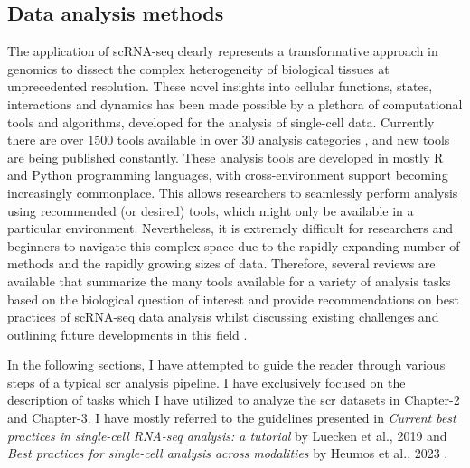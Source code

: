 \subsection{Data analysis methods}
\label{sec:scrna_analysis}
The application of scRNA-seq clearly represents a transformative approach in genomics to dissect the complex heterogeneity of biological tissues at unprecedented resolution. These novel insights into cellular functions, states, interactions and dynamics has been made possible by  a plethora of computational tools and algorithms, developed for the analysis of single-cell data. Currently there are over 1500 tools available in over 30 analysis categories \textbf{\cite{noauthor_scrna-tools_nodate}}, and new tools are being published constantly. These analysis tools are developed in mostly R and Python programming languages, with cross-environment support becoming increasingly commonplace. This allows researchers to seamlessly perform analysis using recommended (or desired) tools, which might only be available in a particular environment. Nevertheless, it is extremely difficult for researchers and beginners to navigate this complex space due to the rapidly expanding number of methods and the rapidly growing sizes of data. Therefore, several reviews are available that summarize the many tools available for a variety of analysis tasks based on the biological question of interest and provide recommendations on best practices of scRNA-seq data analysis whilst discussing existing challenges and outlining future developments in this field \textbf{\cite{zappia_exploring_2018,wu_tools_2020,balzer_how_2021,su_data_2022,ke_single_2022,lueckenmalte_d_current_2019,heumos_best_2023}}.

\vspace{0.2cm}

\begin{Abstract}
\vspace{3mm}
In the following sections, I have attempted to guide the reader through various steps of a typical \gls{scr} analysis pipeline. I have exclusively focused on the description of tasks which I have utilized to analyze the \gls{scr} datasets in Chapter-2 and Chapter-3. I have mostly referred to the guidelines presented in \textit{Current best practices in single-cell RNA-seq analysis: a tutorial} by Luecken et al., 2019 \textbf{\cite{lueckenmalte_d_current_2019}} and \textit{Best practices for single-cell analysis across modalities} by Heumos et al., 2023 \textbf{\cite{heumos_best_2023}}.
\vspace{3mm}
\end{Abstract}


